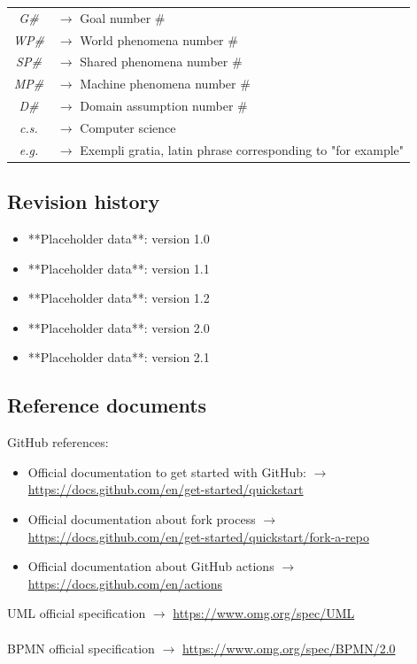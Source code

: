 \documentclass{article}
\begin{document}
{\begin{xltabular}{\textwidth}{ >{\raggedright\arraybackslash}c >{\raggedright\arraybackslash}X }
            \textit{G\#} & $\rightarrow$ Goal number \#
            \\
            \textit{WP\#} & $\rightarrow$ World phenomena number \#
            \\
            \textit{SP\#} & $\rightarrow$ Shared phenomena number \#
            \\
            \textit{MP\#} & $\rightarrow$ Machine phenomena number \#
            \\
            \textit{D\#} & $\rightarrow$ Domain assumption number \#
            \\
            \textit{c.s.} & $\rightarrow$ Computer science
            \\
            \textit{e.g.} & $\rightarrow$ Exempli gratia, latin phrase corresponding to "for example"
        \end{xltabular}     

\subsection{Revision history}
    \begin{itemize}
        \item **Placeholder data**: version 1.0
        \item **Placeholder data**: version 1.1
        \item **Placeholder data**: version 1.2
        \item **Placeholder data**: version 2.0
        \item **Placeholder data**: version 2.1
    \end{itemize}    
\subsection{Reference documents}
    GitHub references:
    \begin{itemize}
        \item Official documentation to get started with GitHub: $\rightarrow$ \url{https://docs.github.com/en/get-started/quickstart}
        \item Official documentation about fork process $\rightarrow$ \url{https://docs.github.com/en/get-started/quickstart/fork-a-repo}
        \item Official documentation about GitHub actions $\rightarrow$ \url{https://docs.github.com/en/actions}
    \end{itemize}
    UML official specification $\rightarrow$ \url{https://www.omg.org/spec/UML}
    \\ \\
    BPMN official specification $\rightarrow$ \url{https://www.omg.org/spec/BPMN/2.0}
}
\end{document}
